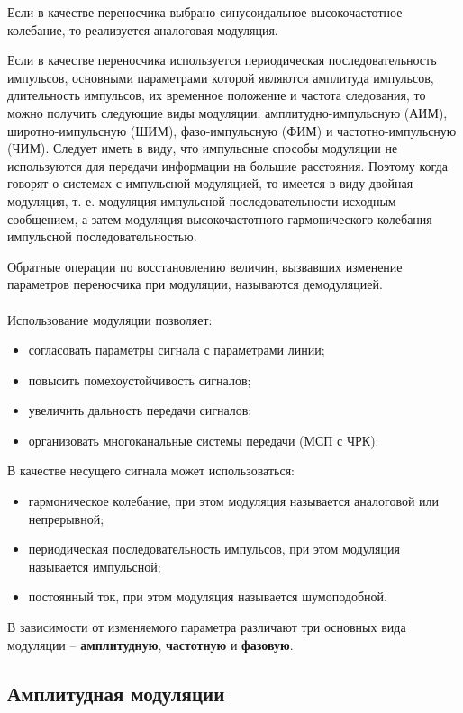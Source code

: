 \documentclass[a4paper,14pt]{extarticle}
\begin{document}
Если в качестве переносчика выбрано синусоидальное высокочастотное колебание, то реализуется аналоговая модуляция.

Если в качестве переносчика используется периодическая последовательность импульсов, основными параметрами которой являются амплитуда импульсов, длительность импульсов, их временное положение и частота следования, то можно получить следующие виды модуляции: амплитудно-импульсную (АИМ), широтно-импульсную (ШИМ), фазо-импульсную (ФИМ) и частотно-импульсную (ЧИМ). Следует иметь в виду, что импульсные способы модуляции не используются для передачи информации на большие расстояния. Поэтому когда говорят о системах с импульсной модуляцией, то имеется в виду двойная модуляция, т. е. модуляция импульсной последовательности исходным сообщением, а затем модуляция высокочастотного гармонического колебания импульсной последовательностью.

Обратные операции по восстановлению величин, вызвавших изменение параметров переносчика при модуляции, называются демодуляцией.\\\\
Использование модуляции позволяет:
\begin{itemize}
\item согласовать параметры сигнала с параметрами линии;
\item повысить помехоустойчивость сигналов;
\item увеличить дальность передачи сигналов;
\item организовать многоканальные системы передачи (МСП с ЧРК).\\
\end{itemize}
В качестве несущего сигнала может использоваться:
\begin{itemize}
\item гармоническое колебание, при этом модуляция называется аналоговой или непрерывной;
\item периодическая последовательность импульсов, при этом модуляция называется импульсной;
\item постоянный ток, при этом модуляция называется шумоподобной.\\
\end{itemize}

В зависимости от изменяемого параметра различают три основных вида модуляции – \textbf{амплитудную}, \textbf{частотную} и \textbf{фазовую}.

\subsection{Амплитудная модуляции}
\end{document}
